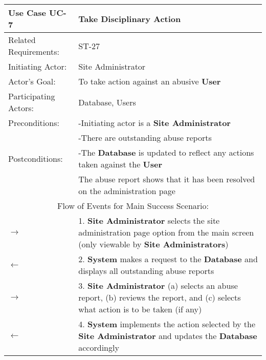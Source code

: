 \begin{centering}
\renewcommand\arraystretch{1.3} %
\begin{longtable}{|p{1.2in} p{5in}|}
\hline
\bfseries{\color{color1}Use Case UC-7} & \bfseries{\color{color1}Take Disciplinary Action} \\
\hline
Related Requirements: & ST-27 \\ 
Initiating Actor:     & Site Administrator \\
Actor's Goal:         & To take action against an abusive \textbf{User} \\
Participating Actors:  & Database, Users \\
Preconditions:        & -Initiating actor is a \textbf{Site Administrator} \\
 & -There are outstanding abuse reports \\
Postconditions:       & -The \textbf{Database} is updated to reflect any actions taken against the \textbf{User} \\
 & The abuse report shows that it has been resolved on the administration page\\
\hline
\multicolumn{2}{|c|}{\color{color1}Flow of Events for Main Success Scenario:}\\
\hline
$\rightarrow$ & 1. \textbf{Site Administrator} selects the site administration page option from the main screen (only viewable by \textbf{Site Administrators}) \\
$\leftarrow$ & 2. \textbf{System} makes a request to the \textbf{Database} and displays all outstanding abuse reports\\
$\rightarrow$ & 3. \textbf{Site Administrator} (a) selects an abuse report, (b) reviews the report, and (c) selects what action is to be taken (if any)\\
$\leftarrow$ & 4. \textbf{System} implements the action selected by the \textbf{Site Administrator} and updates the \textbf{Database} accordingly \\
\hline
\end{longtable}
\end{centering}
